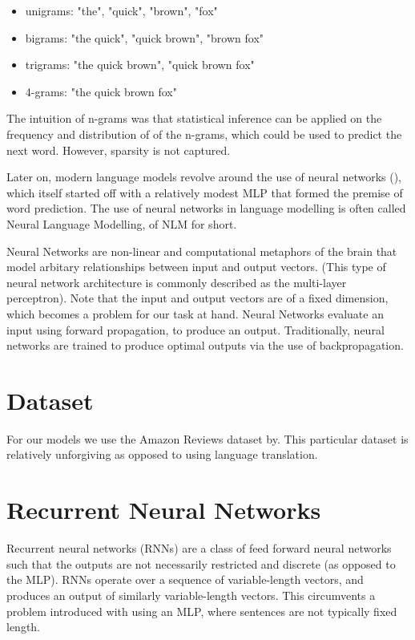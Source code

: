 \documentclass[12pt,twoside]{report}
\begin{document}
\begin{itemize}  
	\item unigrams: "the", "quick", "brown", "fox"
	\item bigrams: "the quick", "quick brown", "brown fox"
	\item trigrams: "the quick brown", "quick brown fox"
	\item 4-grams: "the quick brown fox"
\end{itemize}

The intuition of n-grams was that statistical inference can be applied on the frequency and distribution of of the n-grams, which could be used to predict the next word. However, sparsity is not captured.

Later on, modern language models revolve around the use of neural networks (\cite{bengio_neural_2001}), which itself started off with a relatively modest MLP that formed the premise of word prediction. The use of neural networks in language modelling is often called Neural Language Modelling, of NLM for short.

Neural Networks are non-linear and computational metaphors of the brain that model arbitary relationships between input and output vectors. (This type of neural network architecture is commonly described as the multi-layer perceptron). Note that the input and output vectors are of a fixed dimension, which becomes a problem for our task at hand. Neural Networks evaluate an input using forward propagation, to produce an output. Traditionally, neural networks are trained to produce optimal outputs via the use of backpropagation. 


\section{Dataset}


For our models we use the Amazon Reviews dataset by\cite{he_ups_2016}. This particular dataset is relatively unforgiving as opposed to using language translation.

\section{Recurrent Neural Networks}
\label{rnn}
Recurrent neural networks (RNNs) are a class of feed forward neural networks such that the outputs are not necessarily restricted and discrete (as opposed to the MLP). RNNs operate over a sequence of variable-length vectors, and produces an output of similarly variable-length vectors. This circumvents a problem introduced with using an MLP, where sentences are not typically fixed length. 
\end{document}
